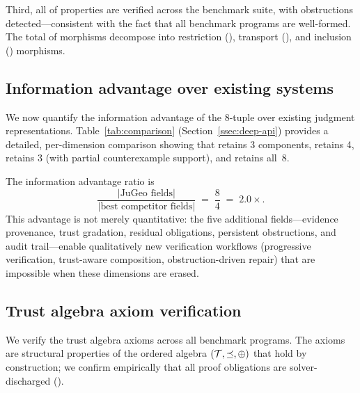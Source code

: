 \documentclass[11pt]{article}
\begin{document}
Third, all \compPropsOkSum{} of \compPropsSum{} properties are verified
across the benchmark suite, with \compObstructionTotal{} obstructions
detected---consistent with the fact that all benchmark programs are
well-formed.  The total of \compMorphTotal{} morphisms decompose into
\compMorphRestriction{} restriction (\compMorphRestrictionPct{}),
\compMorphTransport{} transport (\compMorphTransportPct{}), and
\compMorphInclusion{} inclusion (\compMorphInclusionPct{}) morphisms.

\subsection{Information advantage over existing systems}\label{ssec:info-adv}

We now quantify the information advantage of the 8-tuple over existing
judgment representations.  Table~\ref{tab:comparison} (Section~\ref{ssec:deep-api})
provides a detailed, per-dimension comparison showing that \LEAN{} retains
3 components, \Fstar{} retains 4, \Dafny{} retains 3 (with partial
counterexample support), and \JuGeo{} retains all~8.

The information advantage ratio is
\[
  \frac{|\text{JuGeo fields}|}{|\text{best competitor fields}|}
  \;=\; \frac{8}{4} \;=\; 2.0\times.
\]
This advantage is not merely quantitative: the five additional
fields---evidence provenance, trust gradation, residual obligations,
persistent obstructions, and audit trail---enable qualitatively new
verification workflows (progressive verification, trust-aware
composition, obstruction-driven repair) that are impossible when
these dimensions are erased.

\subsection{Trust algebra axiom verification}\label{ssec:axioms}

We verify the trust algebra axioms across all \compTotalPrograms{} benchmark
programs.  The axioms are structural properties of the ordered algebra
$(\mathcal{T}, \preceq, \oplus)$ that hold by construction; we confirm
empirically that all \compTrustTotal{} proof obligations are
solver-discharged (\compTrustSolverdischargedPct{}).
\end{document}
